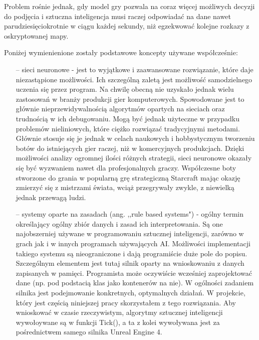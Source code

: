 \documentclass[12pt]{report}
\begin{document}
Problem rośnie jednak, gdy model gry pozwala na coraz więcej możliwych decyzji do podjęcia i sztuczna inteligencja musi raczej odpowiadać na dane nawet parudziesięciokrotnie w ciągu każdej sekundy, niż egzekwować kolejne rozkazy z oskryptowanej mapy. 

Poniżej wymienienione zostały podstawowe koncepty używane współcześnie:
\begin{itemize}
\item[--] sieci neuronowe - jest to wyjątkowe i zaawansowane rozwiązanie, które daje niezastąpione możliwości. Ich szczególną zaletą jest możliwość samodzielnego uczenia się przez program. Na chwilę obecną nie uzyskało jednak wielu zastosowań w branży produkcji gier komputerowych. Spowodowane jest to głównie nieprzewidywalnością algorytmów opartych na sieciach oraz trudnością w ich debugowaniu. Mogą być jednak użyteczne w przypadku problemów nieliniowych, które ciężko rozwiązać tradycyjnymi metodami. Głównie stosuje się je jednak w celach naukowych i hobbystycznym tworzeniu botów do istniejących gier raczej, niż w komercyjnych produkcjach. Dzięki możliwości analizy ogromnej ilości różnych strategii, sieci neuronowe okazały się być wyzwaniem nawet dla profesjonalnych graczy. Współczesne boty stworzone do grania w popularną grę strategiczną Starcraft mając okazję zmierzyć się z mistrzami świata, wciąż przegrywały zwykle, z niewielką jednak przewagą ludzi.
\item[--]  systemy oparte na zasadach (ang. ,,rule based systems") - ogólny termin określający ogólny zbiór danych i zasad ich interpretowania. Są one najobszerniej używane w programowaniu sztucznej inteligencji, zarówno w grach jak i w innych programach używających AI. Możliwości implementacji takiego systemu są nieograniczone i dają programiście duże pole do popisu. Szczególnym elementem jest tutaj silnik oparty na wnioskowaniu z danych zapisanych w pamięci. Programista może oczywiście wcześniej zaprojektować dane (np. pod podstacią klas jako kontenerów na nie). W ogólności zadaniem silnika jest podejmowanie konkretnych, optymalnych działań. W projekcie, który jest częścią niniejszej pracy skorzystałem z tego rozwiązania. Aby wnioskować w czasie rzeczywistym, algorytmy sztucznej inteligencji wywołoywane są w funkcji Tick(), a ta z kolei wywoływana jest za pośrednictwem samego silnika Unreal Engine 4.

\end{itemize}
\end{document}

